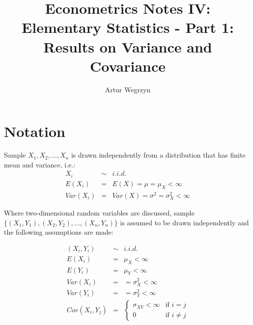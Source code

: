 \documentclass[12pt]{article}
\begin{document}
\title{Econometrics Notes IV: Elementary Statistics - Part 1: Results on Variance and Covariance}
\author{Artur Wegrzyn}
\maketitle


\tableofcontents



\section{Notation}
Sample $X_1, X_2, \dots, X_n$ is drawn independently from a distribution that
has finite mean and variance, i.e.:
\begin{eqnarray*}
X_i &\sim & i.i.d. \\
E(X_i) &=& E(X) = \mu = \mu_X < \infty \\
Var(X_i) &=& Var(X) = \sigma^2 = \sigma^2_X < \infty
\end{eqnarray*}

Where two-dimensional random variables are discussed, sample 
$\{ (X_1 ,Y_1), (X_2, Y_2), ..., (X_n, Y_n) \}$ is assumed to be drawn independently 
and the following assumptions are made:

\begin{eqnarray*}
(X_i, Y_i) &\sim & i.i.d. \\
E(X_i) &=& \mu_X < \infty \\
E(Y_i) &=& \mu_Y < \infty \\
Var(X_i) &=& = \sigma^2_X < \infty \\
Var(Y_i) &=& = \sigma^2_Y < \infty \\ 
Cov(X_i, Y_j) &=& \begin{cases}
\sigma_{XY} < \infty & \text{if } i=j \\ 
0 & \text{if } i \neq j
\end{cases}
\end{eqnarray*}
\end{document}

